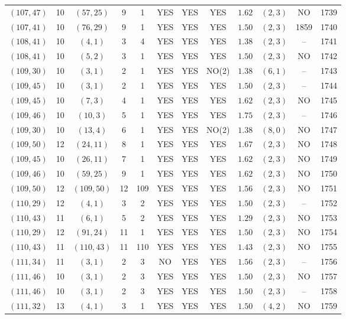 \begin{longtable}{|c|c|c|c|c|c|c|c|c|c|c|c|}
$(107,47)$ & 10 & $(57,25)$ & 9 & 1 & YES & YES & YES & $1.62$ & $(2,3)$ & NO & 1739\\
$(107,41)$ & 10 & $(76,29)$ & 9 & 1 & YES & YES & YES & $1.50$ & $(2,3)$ & 1859 & 1740\\
$(108,41)$ & 10 & $(4,1)$ & 3 & 4 & YES & YES & YES & $1.38$ & $(2,3)$ & -- & 1741\\
$(108,41)$ & 10 & $(5,2)$ & 3 & 1 & YES & YES & YES & $1.50$ & $(2,3)$ & NO & 1742\\
$(109,30)$ & 10 & $(3,1)$ & 2 & 1 & YES & YES & NO(2) & $1.38$ & $(6,1)$ & -- & 1743\\
$(109,45)$ & 10 & $(3,1)$ & 2 & 1 & YES & YES & YES & $1.50$ & $(2,3)$ & -- & 1744\\
$(109,45)$ & 10 & $(7,3)$ & 4 & 1 & YES & YES & YES & $1.62$ & $(2,3)$ & NO & 1745\\
$(109,46)$ & 10 & $(10,3)$ & 5 & 1 & YES & YES & YES & $1.75$ & $(2,3)$ & -- & 1746\\
$(109,30)$ & 10 & $(13,4)$ & 6 & 1 & YES & YES & NO(2) & $1.38$ & $(8,0)$ & NO & 1747\\
$(109,50)$ & 12 & $(24,11)$ & 8 & 1 & YES & YES & YES & $1.67$ & $(2,3)$ & NO & 1748\\
$(109,45)$ & 10 & $(26,11)$ & 7 & 1 & YES & YES & YES & $1.62$ & $(2,3)$ & NO & 1749\\
$(109,46)$ & 10 & $(59,25)$ & 9 & 1 & YES & YES & YES & $1.62$ & $(2,3)$ & NO & 1750\\
$(109,50)$ & 12 & $(109,50)$ & 12 & 109 & YES & YES & YES & $1.56$ & $(2,3)$ & NO & 1751\\
$(110,29)$ & 12 & $(4,1)$ & 3 & 2 & YES & YES & YES & $1.50$ & $(2,3)$ & -- & 1752\\
$(110,43)$ & 11 & $(6,1)$ & 5 & 2 & YES & YES & YES & $1.29$ & $(2,3)$ & NO & 1753\\
$(110,29)$ & 12 & $(91,24)$ & 11 & 1 & YES & YES & YES & $1.50$ & $(2,3)$ & NO & 1754\\
$(110,43)$ & 11 & $(110,43)$ & 11 & 110 & YES & YES & YES & $1.43$ & $(2,3)$ & NO & 1755\\
$(111,34)$ & 11 & $(3,1)$ & 2 & 3 & NO & YES & YES & $1.56$ & $(2,3)$ & -- & 1756\\
$(111,46)$ & 10 & $(3,1)$ & 2 & 3 & YES & YES & YES & $1.50$ & $(2,3)$ & NO & 1757\\
$(111,46)$ & 10 & $(3,1)$ & 2 & 3 & YES & YES & YES & $1.50$ & $(2,3)$ & -- & 1758\\
$(111,32)$ & 13 & $(4,1)$ & 3 & 1 & YES & YES & YES & $1.50$ & $(4,2)$ & NO & 1759\\

\end{longtable}
